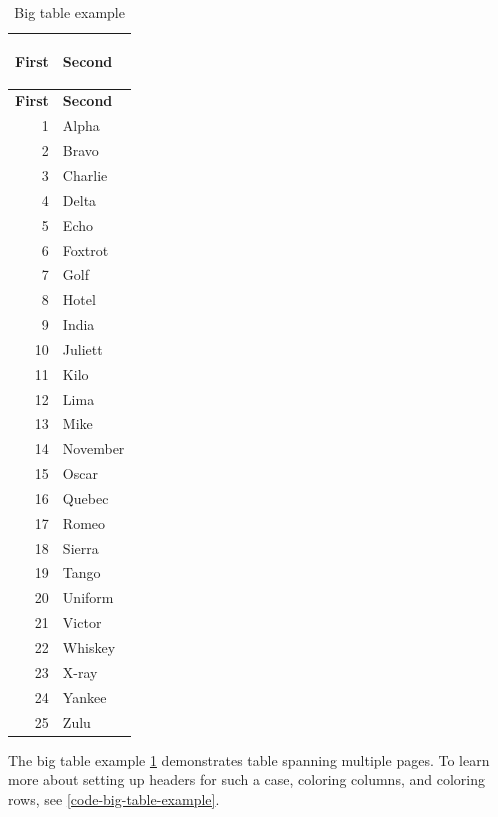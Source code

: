 \begin{longtable}{r|>{\columncolor{white-near}}l}
    \caption{Big table example}\\
    \label{big-table-example}

    \textbf{First} & \textbf{Second}\\
    \hline
    \endfirsthead

    \textbf{First} & \textbf{Second}\\
    \hline
    \endhead
    
    1 & Alpha\\
    2 & Bravo\\
    3 & Charlie\\
    4 & Delta\\
    \rowcolor{yellow-dark}\color{white-pure}5 & Echo\\
    6 & Foxtrot\\
    7 & Golf\\
    8 & Hotel\\
    9 & India\\
    10 & Juliett\\
    11 & Kilo\\
    12 & Lima\\
    13 & Mike\\
    14 & November\\
    15 & Oscar\\
    16 & Quebec\\
    17 & Romeo\\
    18 & Sierra\\
    19 & Tango\\
    20 & Uniform\\
    21 & Victor\\
    22 & Whiskey\\
    23 & X-ray\\
    24 & Yankee\\
    25 & Zulu\\
\end{longtable}

The big table example \cref{big-table-example} demonstrates table spanning multiple pages.
To learn more about setting up headers for such a case, coloring columns, and coloring rows,
see \cref{code-big-table-example}.


